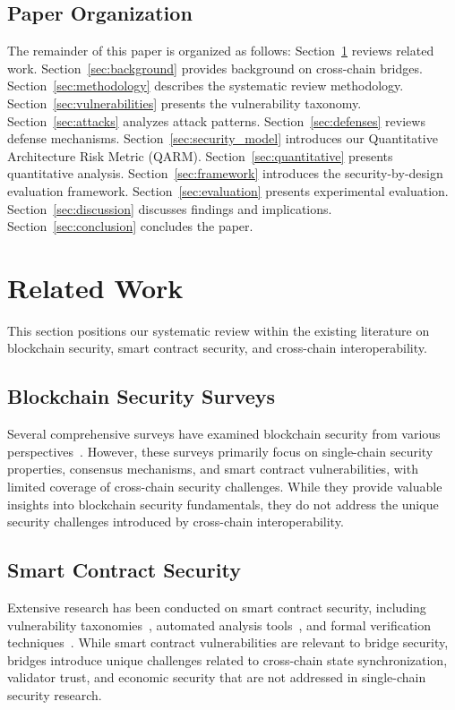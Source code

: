 \documentclass[runningheads]{llncs}
\begin{document}
\subsection{Paper Organization}
The remainder of this paper is organized as follows: Section~\ref{sec:related} reviews related work. Section~\ref{sec:background} provides background on cross-chain bridges. Section~\ref{sec:methodology} describes the systematic review methodology. Section~\ref{sec:vulnerabilities} presents the vulnerability taxonomy. Section~\ref{sec:attacks} analyzes attack patterns. Section~\ref{sec:defenses} reviews defense mechanisms. Section~\ref{sec:security_model} introduces our Quantitative Architecture Risk Metric (QARM). Section~\ref{sec:quantitative} presents quantitative analysis. Section~\ref{sec:framework} introduces the security-by-design evaluation framework. Section~\ref{sec:evaluation} presents experimental evaluation. Section~\ref{sec:discussion} discusses findings and implications. Section~\ref{sec:conclusion} concludes the paper.

\vspace{-0.3cm}
\section{Related Work}
\label{sec:related}

This section positions our systematic review within the existing literature on blockchain security, smart contract security, and cross-chain interoperability.

\subsection{Blockchain Security Surveys}
Several comprehensive surveys have examined blockchain security from various perspectives~\cite{li2022survey,zhou2022state}. However, these surveys primarily focus on single-chain security properties, consensus mechanisms, and smart contract vulnerabilities, with limited coverage of cross-chain security challenges. While they provide valuable insights into blockchain security fundamentals, they do not address the unique security challenges introduced by cross-chain interoperability.

\subsection{Smart Contract Security}
Extensive research has been conducted on smart contract security, including vulnerability taxonomies~\cite{huang2021survey}, automated analysis tools~\cite{chen2020defining}, and formal verification techniques~\cite{ahmed2021survey}. While smart contract vulnerabilities are relevant to bridge security, bridges introduce unique challenges related to cross-chain state synchronization, validator trust, and economic security that are not addressed in single-chain security research.
\end{document}
